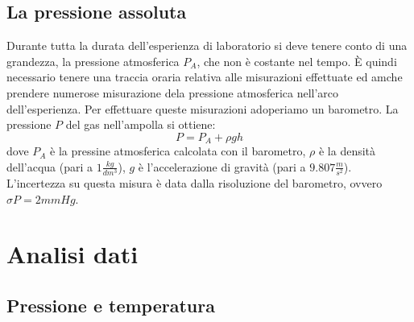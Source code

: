 \subsection{La pressione assoluta}
Durante tutta la durata dell'esperienza di laboratorio si deve tenere conto di una grandezza, la pressione atmosferica $P_A$, che non è costante nel tempo.
È quindi necessario tenere una traccia oraria relativa alle misurazioni effettuate ed amche prendere numerose misurazione dela pressione atmosferica nell'arco dell'esperienza.
Per effettuare queste misurazioni adoperiamo un barometro.
La pressione $P$ del gas nell'ampolla si ottiene:
\begin{equation}
P = P_A + \rho g h
\end{equation}
dove $P_A$ è la pressine atmosferica calcolata con il barometro, $\rho$ è la densità dell'acqua (pari a $1 \frac{kg}{dm^3}$), $g$
è l'accelerazione di gravità (pari a $9.807 \frac{m}{s^2}$).
L'incertezza su questa misura è data dalla risoluzione del barometro, ovvero $\sigma P = 2 mmHg$.

\section{Analisi dati}
\subsection{Pressione e temperatura}

